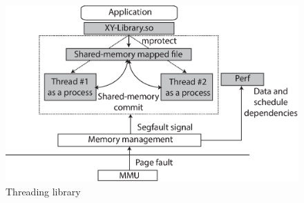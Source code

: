 
\begin{figure}[t]

\centering
      \includegraphics[scale=.3]{figure/Library-architecture}
  \caption{Threading library}
   
  \label{fig:lib-architecture}

\end{figure}
